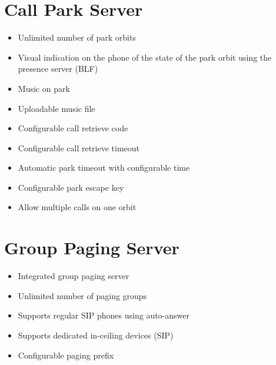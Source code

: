 \documentclass[letterpaper,10pt,english]{sphinxmanual}
\begin{document}
\section{Call Park Server}
\label{\detokenize{features:call-park-server}}\begin{itemize}
\item {} 
Unlimited number of park orbits

\item {} 
Visual indication on the phone of the state of the park orbit using the presence server (BLF)

\item {} 
Music on park

\item {} 
Uploadable music file

\item {} 
Configurable call retrieve code

\item {} 
Configurable call retrieve timeout

\item {} 
Automatic park timeout with configurable time

\item {} 
Configurable park escape key

\item {} 
Allow multiple calls on one orbit

\end{itemize}


\section{Group Paging Server}
\label{\detokenize{features:group-paging-server}}\begin{itemize}
\item {} 
Integrated group paging server

\item {} 
Unlimited number of paging groups

\item {} 
Supports regular SIP phones using auto-answer

\item {} 
Supports dedicated in-ceiling devices (SIP)

\item {} 
Configurable paging prefix

\end{itemize}
\end{document}

